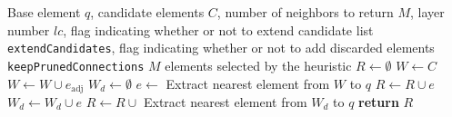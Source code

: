 \begin{algorithm}[H]
\caption{SELECT-NEIGHBORS-HEURISTIC($q$, $C$, $M$, $lc$, \texttt{extendCandidates}, \texttt{keepPrunedConnections})}
\begin{algorithmic}[1]
\Require Base element $q$, candidate elements $C$, number of neighbors to return $M$, layer number $lc$, flag indicating whether or not to extend candidate list \texttt{extendCandidates}, flag indicating whether or not to add discarded elements \texttt{keepPrunedConnections}
\Ensure $M$ elements selected by the heuristic
\State $R \gets \emptyset$
\State $W \gets C$ 
 
                \State $W \gets W \cup e_{\text{adj}}$
            \EndIf
        \EndFor
    \EndFor
\EndIf
\State $W_d \gets \emptyset$ 
    \State $e \gets$ Extract nearest element from $W$ to $q$
        \State $R \gets R \cup e$
    \Else
        \State $W_d \gets W_d \cup e$
    \EndIf
\EndWhile
{} 
        \State $R \gets R \cup$ Extract nearest element from $W_d$ to $q$
    \EndWhile
\EndIf
\State \textbf{return} $R$
\end{algorithmic}
\end{algorithm}